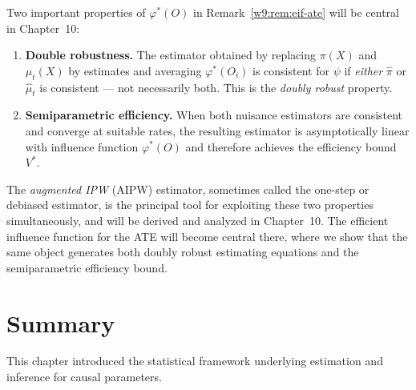 \documentclass[master.tex]{subfiles}
\begin{document}
\begin{remark}
\label{w9:rem:bridge}
Two important properties of $\varphi^*(O)$ in Remark~\ref{w9:rem:eif-ate}
will be central in Chapter~10:
\begin{enumerate}[label=(\roman*)]
  \item \textbf{Double robustness.}  The estimator obtained by
    replacing $\pi(X)$ and $\mu_t(X)$ by estimates and averaging
    $\varphi^*(O_i)$ is consistent for $\psi$ if \emph{either}
    $\hat\pi$ or $\hat\mu_t$ is consistent — not necessarily both.
    This is the \emph{doubly robust} property.
  \item \textbf{Semiparametric efficiency.}  When both nuisance
    estimators are consistent and converge at suitable rates, the
    resulting estimator is asymptotically linear with influence function
    $\varphi^*(O)$ and therefore achieves the efficiency bound $V^*$.
\end{enumerate}
The \emph{augmented IPW} (AIPW) estimator, sometimes called the
one-step or debiased estimator, is the principal tool for exploiting
these two properties simultaneously, and will be derived and analyzed
in Chapter~10.  The efficient influence function for the ATE will
become central there, where we show that the same object generates
both doubly robust estimating equations and the semiparametric
efficiency bound.
\end{remark}

\section{Summary}
\label{w9:sec:summary}

This chapter introduced the statistical framework underlying estimation
and inference for causal parameters.
\end{document}
